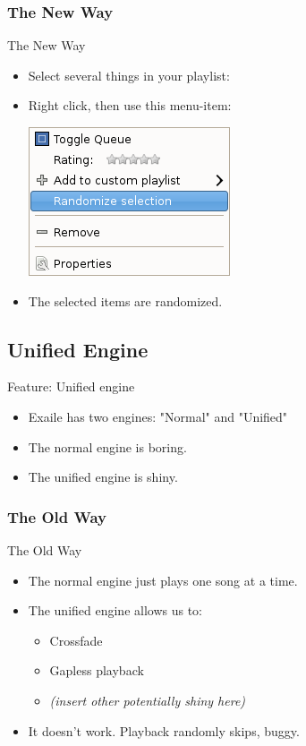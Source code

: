 \documentclass{beamer}
\begin{document}
\subsubsection{The New Way}
\begin{frame}{The New Way}
  \begin{itemize}
  \item Select several things in your playlist:
  \item Right click, then use this menu-item:

    \includegraphics[keepaspectratio]{images/randomize-menu-item}
  \item The selected items are randomized.
  \end{itemize}
\end{frame}

\subsection{Unified Engine}

\begin{frame}{Feature: Unified engine}
  \begin{itemize}
    \item Exaile has two engines: "Normal" and "Unified"
	\item The normal engine is boring.
	\item The unified engine is shiny.
  \end{itemize}
\end{frame}

\subsubsection{The Old Way}
\begin{frame}{The Old Way}
  \begin{itemize}
    \item The normal engine just plays one song at a time.
	\item The unified engine allows us to:
	  \begin{itemize}
	    \item Crossfade
		\item Gapless playback
		\item \textit{(insert other potentially shiny here)}
      \end{itemize}
	\item It doesn't work. Playback randomly skips, buggy.
  \end{itemize}
\end{frame}
\end{document}
